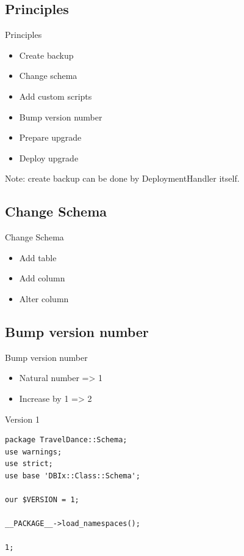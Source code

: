 \subsection{Principles}

\begin{frame}{Principles}
\begin{itemize}
\item Create backup
\item Change schema
\item Add custom scripts
\item Bump version number
\item Prepare upgrade
\item Deploy upgrade
\end{itemize}
\end{frame}

Note: create backup can be done by DeploymentHandler itself.

\subsection{Change Schema}

\begin{frame}{Change Schema}
\begin{itemize}
\item Add table
\item Add column
\item Alter column
\end{itemize}
\end{frame}

\subsection{Bump version number}
\begin{frame}{Bump version number}
\begin{itemize}
\item Natural number => 1
\item Increase by 1 => 2
\end{itemize}
\end{frame}

\begin{frame}[fragile]{Version 1}
\begin{lstlisting}
package TravelDance::Schema;
use warnings;
use strict;
use base 'DBIx::Class::Schema';

our $VERSION = 1;

__PACKAGE__->load_namespaces();

1;
\end{lstlisting}
\end{frame}

